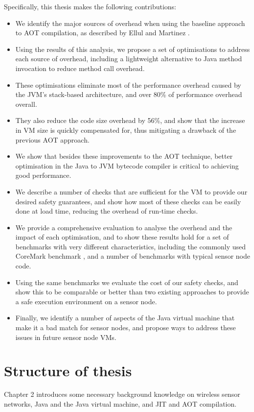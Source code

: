 Specifically, this thesis makes the following contributions:
\begin{itemize}
	\item We identify the major sources of overhead when using the baseline approach to AOT compilation, as described by Ellul and Martinez \cite{Ellul:2010iw, Ellul:2012thesis}.
	\item Using the results of this analysis, we propose a set of optimisations to address each source of overhead, including a lightweight alternative to Java method invocation to reduce method call overhead.
	\item These optimisations eliminate most of the performance overhead caused by the JVM's stack-based architecture, and over 80\% of performance overhead overall.
	\item They also reduce the code size overhead by 56\%, and show that the increase in VM size is quickly compensated for, thus mitigating a drawback of the previous AOT approach.
	\item We show that besides these improvements to the AOT technique, better optimisation in the Java to JVM bytecode compiler is critical to achieving good performance.
	\item We describe a number of checks that are sufficient for the VM to provide our desired safety guarantees, and show how most of these checks can be easily done at load time, reducing the overhead of run-time checks.
	\item We provide a comprehensive evaluation to analyse the overhead and the impact of each optimisation, and to show these results hold for a set of benchmarks with very different characteristics, including the commonly used CoreMark benchmark \cite{coremark}, and a number of benchmarks with typical sensor node code.
	\item Using the same benchmarks we evaluate the cost of our safety checks, and show this to be comparable or better than two existing approaches to provide a safe execution environment on a sensor node.
	\item Finally, we identify a number of aspects of the Java virtual machine that make it a bad match for sensor nodes, and propose ways to address these issues in future sensor node VMs.
\end{itemize}

\section{Structure of thesis}
Chapter 2 introduces some necessary background knowledge on wireless sensor networks, Java and the Java virtual machine, and JIT and AOT compilation.

